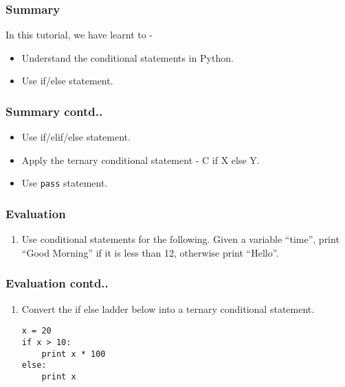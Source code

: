 \documentclass[17pt,compress]{beamer}
\newcounter{saveenumi}
\newcommand{\seti}{\setcounter{saveenumi}{\value{enumi}}}
\newcommand{\conti}{\setcounter{enumi}{\value{saveenumi}}}
\begin{document}
\begin{frame}
\frametitle{Summary}
\label{sec-10.1}

 In this tutorial, we have learnt to -


\begin{itemize}
\item Understand the conditional statements in Python.
\item Use if/else statement.
\end{itemize}
\end{frame}
\begin{frame}
\frametitle{Summary contd..}
\label{sec-10.2}

\begin{itemize}
\item Use if/elif/else statement.
\item Apply the ternary conditional statement - C if X else Y.
\item Use \texttt{pass} statement.
\end{itemize}
\end{frame}
\begin{frame}[fragile]
\frametitle{Evaluation}
\label{sec-11.1}

\begin{enumerate}
\item Use conditional statements for the following.
   Given a variable ``time'', print ``Good Morning'' if it is less
   than 12, otherwise print ``Hello''.
\seti
\end{enumerate}
\end{frame}
\begin{frame}[fragile]
\frametitle{Evaluation contd..}
\label{sec-11.2}

\begin{enumerate}
\conti
\item Convert the if else ladder below into a ternary conditional
   statement.
\lstset{language=Python}
\begin{lstlisting}
x = 20
if x > 10:
    print x * 100
else:
    print x
\end{lstlisting}
\end{enumerate}
\end{frame}
\end{document}
